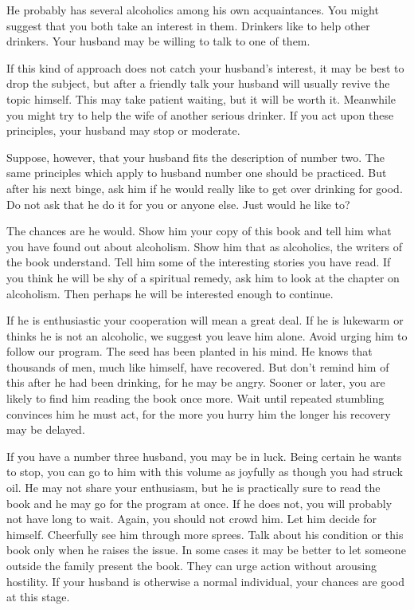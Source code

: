 \begin{biblechapter}
He probably has several alcoholics among his own acquaintances.  You might suggest that you both take an interest in them.  Drinkers like to help other drinkers.  Your husband may be willing to talk to one of them.

If this kind of approach does not catch your husband's interest, it may be best to drop the subject, but after a friendly talk your husband will usually revive the topic himself.  This may take patient waiting, but it will be worth it.  Meanwhile you might try to help the wife of another serious drinker.  If you act upon these principles, your husband may stop or moderate.

Suppose, however, that your husband fits the description of number two.  The same principles which apply to husband number one should be practiced.  But after his next binge, ask him if he would really like to get over drinking for good.  Do not ask that he do it for you or anyone else.  Just would he like to?

The chances are he would.  Show him your copy of this book and tell him what you have found out about alcoholism.  Show him that as alcoholics, the writers of the book understand.  Tell him some of the interesting stories you have read.  If you think he will be shy of a spiritual remedy, ask him to look at the chapter on alcoholism.  Then perhaps he will be interested enough to continue.

If he is enthusiastic your cooperation will mean a great deal.  If he is lukewarm or thinks he is not an alcoholic, we suggest you leave him alone.  Avoid urging him to follow our program.  The seed has been planted in his mind.  He knows that thousands of men, much like himself, have recovered.  But don't remind him of this after he had been drinking, for he may be angry.  Sooner or later, you are likely to find him reading the book once more.  Wait until repeated stumbling convinces him he must act, for the more you hurry him the longer his recovery may be delayed.

If you have a number three husband, you may be in luck.  Being certain he wants to stop, you can go to him with this volume as joyfully as though you had struck oil.  He may not share your enthusiasm, but he is practically sure to read the book and he may go for the program at once.  If he does not, you will probably not have long to wait.  Again, you should not crowd him.  Let him decide for himself.  Cheerfully see him through more sprees.  Talk about his condition or this book only when he raises the issue.  In some cases it may be better to let someone outside the family present the book.  They can urge action without arousing hostility.  If your husband is otherwise a normal individual, your chances are good at this stage.


\end{biblechapter}
